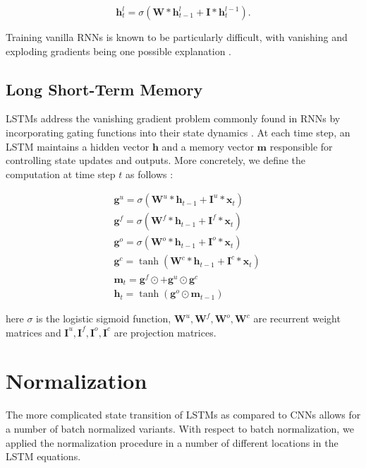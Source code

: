 \documentclass{article}
\def\x{{\mathbf x}}
\begin{document}
\begin{equation}
	\mathbf h_t^{l} = \sigma(\mathbf W * \mathbf h_{t-1}^{l} + \mathbf I * \mathbf h_t^{l-1}).
\end{equation}

Training vanilla RNNs is known to be particularly difficult, with vanishing and exploding gradients being one possible explanation \cite{pascanu2012difficulty}.

\subsection{Long Short-Term Memory}
LSTMs address the vanishing gradient problem commonly found in RNNs by incorporating gating functions into their state dynamics \citep{hochreiter1997long}. At each time step, an LSTM maintains a hidden vector $\mathbf h$ and a memory vector $\mathbf m$  responsible for controlling state updates and outputs. More concretely, we define the computation at time step $t$ as follows \cite{kalchbrenner2015grid}:

\begin{equation}
	\begin{split}
		& \mathbf g^u = \sigma(\mathbf W^u * \mathbf h_{t-1} + \mathbf I^u * \x_t) \\
		& \mathbf g^f = \sigma(\mathbf W^f * \mathbf h_{t-1} + \mathbf I^f * \x_t) \\
		& \mathbf g^o = \sigma(\mathbf W^o * \mathbf h_{t-1} + \mathbf I^o * \x_t) \\
		& \mathbf g^c = \tanh(\mathbf W^c * \mathbf h_{t-1} + \mathbf I^c * \x_t) \\
		& \mathbf m_t = \mathbf g^f \odot \mathbf +  \mathbf g^u \odot \mathbf g^c \\
		& \mathbf h_t = \tanh(\mathbf g^o \odot \mathbf m_{t-1}) 
	\end{split}
\end{equation}

here $\sigma$ is the logistic sigmoid function, $\mathbf W^u, \mathbf W^f, \mathbf W^o, \mathbf W^c$ are recurrent weight matrices and $\mathbf I^u, \mathbf I^f, \mathbf I^o, \mathbf I^c$ are projection matrices.

\section{Normalization}

The more complicated state transition of LSTMs as compared to CNNs allows for a number of batch normalized variants. With respect to batch normalization, we applied the normalization procedure in a number of different locations in the LSTM equations.
\end{document}
